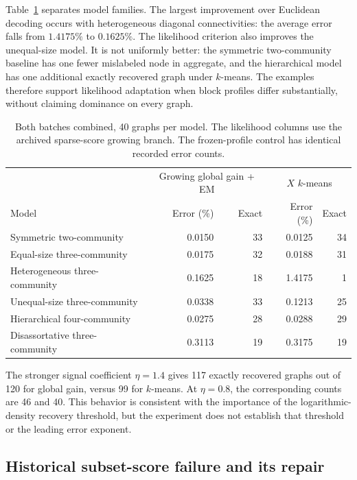 \documentclass[11pt]{article}
\theoremstyle{definition}
\theoremstyle{remark}
\numberwithin{equation}{section}
\begin{document}
Table~\ref{tab:experiment_models} separates model families. The largest
improvement over Euclidean decoding occurs with heterogeneous diagonal
connectivities: the average error falls from $1.4175\%$ to $0.1625\%$.
The likelihood criterion also improves the unequal-size model. It is not
uniformly better: the symmetric two-community baseline has one fewer
mislabeled node in aggregate, and the hierarchical model has one additional
exactly recovered graph under $k$-means. The examples therefore support
likelihood adaptation when block profiles differ substantially, without
claiming dominance on every graph.

\begin{table}[tb]
\centering
\small
\caption{Both batches combined, 40 graphs per model. The likelihood columns use the archived sparse-score growing branch. The frozen-profile control has identical recorded error counts.}
\label{tab:experiment_models}
\begin{tabular}{lrrrr}
\toprule
&\multicolumn{2}{c}{Growing global gain + EM}&\multicolumn{2}{c}{$X$ $k$-means}\\
Model&Error (\%)&Exact&Error (\%)&Exact\\
\midrule
Symmetric two-community&0.0150&33&0.0125&34\\
Equal-size three-community&0.0175&32&0.0188&31\\
Heterogeneous three-community&0.1625&18&1.4175&1\\
Unequal-size three-community&0.0338&33&0.1213&25\\
Hierarchical four-community&0.0275&28&0.0288&29\\
Disassortative three-community&0.3113&19&0.3175&19\\
\bottomrule
\end{tabular}
\end{table}

The stronger signal coefficient $\eta=1.4$ gives 117 exactly recovered graphs
out of 120 for global gain, versus 99 for $k$-means. At $\eta=0.8$, the
corresponding counts are 46 and 40. This behavior is consistent with the
importance of the logarithmic-density recovery threshold, but the experiment
does not establish that threshold or the leading error exponent.

\subsection{Historical subset-score failure and its repair}
\end{document}
